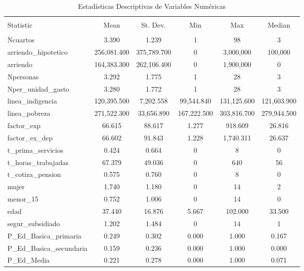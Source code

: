 
\begin{table}[!htbp] \centering 
  \caption{Estadísticas Descriptivas de Variables Numéricas} 
  \label{} 
\begin{tabular}{@{\extracolsep{5pt}}lccccc} 
\\[-1.8ex]\hline 
\hline \\[-1.8ex] 
Statistic & \multicolumn{1}{c}{Mean} & \multicolumn{1}{c}{St. Dev.} & \multicolumn{1}{c}{Min} & \multicolumn{1}{c}{Max} & \multicolumn{1}{c}{Median} \\ 
\hline \\[-1.8ex] 
Ncuartos & 3.390 & 1.239 & 1 & 98 & 3 \\ 
arriendo\_hipotetico & 256,081.400 & 375,789.700 & 0 & 3,000,000 & 100,000 \\ 
arriendo & 164,383.300 & 262,106.400 & 0 & 1,900,000 & 0 \\ 
Npersonas & 3.292 & 1.775 & 1 & 28 & 3 \\ 
Nper\_unidad\_gasto & 3.280 & 1.772 & 1 & 28 & 3 \\ 
linea\_indigencia & 120,395.500 & 7,202.558 & 99,544.840 & 131,125.600 & 121,603.900 \\ 
linea\_pobreza & 271,522.300 & 33,656.890 & 167,222.500 & 303,816.700 & 279,944.500 \\ 
factor\_exp & 66.615 & 88.617 & 1.277 & 918.609 & 26.816 \\ 
factor\_ex\_dep & 66.602 & 91.843 & 1.228 & 1,740.311 & 26.637 \\ 
t\_prima\_servicios & 0.424 & 0.664 & 0 & 8 & 0 \\ 
t\_horas\_trabajadas & 67.379 & 49.036 & 0 & 640 & 56 \\ 
t\_cotiza\_pension & 0.575 & 0.760 & 0 & 8 & 0 \\ 
mujer & 1.740 & 1.180 & 0 & 14 & 2 \\ 
menor\_15 & 0.752 & 1.006 & 0 & 14 & 0 \\ 
edad & 37.440 & 16.876 & 5.667 & 102.000 & 33.500 \\ 
segur\_subsidiado & 1.202 & 1.484 & 0 & 14 & 1 \\ 
P\_Ed\_Basica\_primaria & 0.249 & 0.302 & 0.000 & 1.000 & 0.167 \\ 
P\_Ed\_Basica\_secundaria & 0.159 & 0.236 & 0.000 & 1.000 & 0.000 \\ 
P\_Ed\_Media & 0.221 & 0.278 & 0.000 & 1.000 & 0.071 \\ 

\end{tabular}
\end{table}
